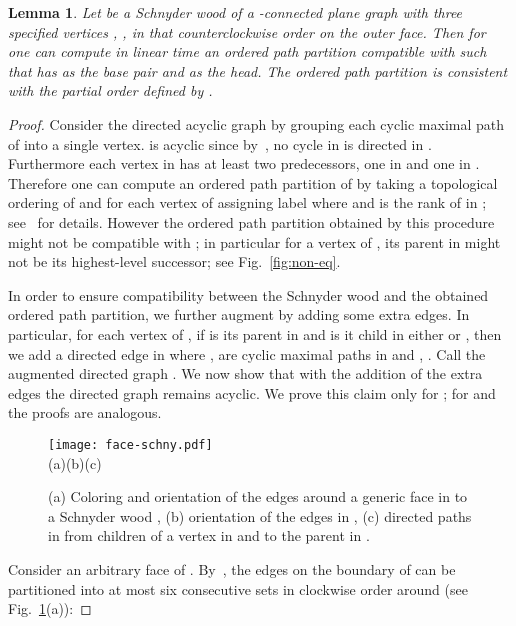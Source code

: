 \documentclass{article}
\newtheorem{lemma}[theorem]{Lemma}
\begin{document}
\begin{lemma}
\label{lem:schny-can}
Let  be a Schnyder wood of a -connected plane graph
 with three specified vertices , ,  in that counterclockwise order on the outer face.
Then for  one can compute in linear time an ordered path partition  compatible with
 such that  has  as the base pair and  as the head.
The ordered path partition is consistent with the partial order defined by
.
\end{lemma}
\begin{proof}
Consider the directed acyclic graph  by grouping each cyclic maximal path of
  into a single vertex.
 is acyclic since by~\cite{FZ08}, no cycle in  is directed in
 .
 Furthermore each vertex in  has at least two predecessors, one in  and one in
 . Therefore one can compute an ordered path partition of  by taking a topological
 ordering  of  and for each vertex  of  assigning  label  where  and
  is the rank of  in ; see~\cite{BBC11} for details. However the ordered path partition obtained
 by this procedure might not be compatible with ; in particular for a vertex  of
 , its parent in  might not be its highest-level successor; see Fig.~\ref{fig:non-eq}.


 In order to ensure compatibility between
 the Schnyder wood and the obtained ordered path partition, we further augment  by adding some
 extra edges. In particular, for each vertex  of , if  is its parent in  and  is it child in
 either  or , then we add a directed edge  in  where ,  are
 cyclic maximal paths in  and , . Call the augmented directed graph .
 We now show that with the addition of the extra edges the directed graph  remains acyclic.
 We prove this claim only for ; for  and  the proofs are analogous.


\begin{figure}[t]
\centering
\texttt{[image: face-schny.pdf]}\\
(a)\hspace{0.27\textwidth}(b)\hspace{0.27\textwidth}(c)\hspace{0.05\textwidth}
\caption{(a) Coloring and orientation of the edges around a generic face in to a Schnyder wood
 , (b) orientation of the edges in
 , (c) directed paths in
  from children of a vertex  in  and 
 to the parent in .}
\label{fig:face-schny}
\end{figure}


Consider an arbitrary face  of . By~\cite{FZ08}, the edges on the boundary of  can be
 partitioned into at most six consecutive sets in clockwise order around 
 (see Fig.~\ref{fig:face-schny}(a)):



\end{proof}
\end{document}
